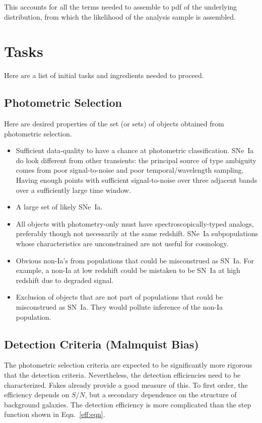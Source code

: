\documentclass[preprint,3p]{elsarticle}
\begin{document}
This accounts for all the terms needed to assemble to pdf of the underlying distribution,
from which the likelihood of the analysis sample is assembled.


\section{Tasks}
Here are a list of initial tasks and ingredients needed to proceed.
\subsection{Photometric Selection}
Here are desired properties of the set (or sets) of objects obtained from photometric selection.
\begin{itemize}
\item Sufficient data-quality to have a chance at photometric classification.
SNe~Ia do look different from other transients: the principal source of type  ambiguity
comes from poor signal-to-noise and poor temporal/wavelength sampling.
Having enough points with sufficient signal-to-noise over three adjacent bands over a 
sufficiently large time window.
\item A large set of likely SNe~Ia.
\item All objects with photometry-only must have spectroscopically-typed analogs, preferably though not necessarily at the same redshift.  SNe~Ia subpopulations whose characteristics
are unconstrained are not useful for cosmology.
\item Obvious non-Ia's from populations that could be misconstrued as SN~Ia.  For example,
a non-Ia at low redshift could be
mistaken to be SN~Ia at high redshift due to degraded signal.  
\item Exclusion of objects that are not part of populations that could be misconstrued as SN~Ia.
They would pollute inference of the non-Ia population.
\end{itemize}

\subsection{Detection Criteria (Malmquist Bias)}
The photometric selection criteria are expected to be significantly more rigorous that
the detection criteria.  Nevertheless, the detection efficiencies need to be characterized.
Fakes already provide a good measure of this.  To first order, the efficiency depends
on $S/N$, but a secondary dependence on the structure of background galaxies.
The detection efficiency is more complicated than the step function
shown in Eqn.~\ref{eff:eqn}.
\end{document}
